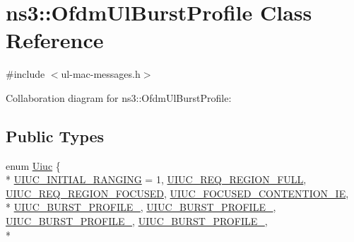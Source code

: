 \hypertarget{classns3_1_1OfdmUlBurstProfile}{}\section{ns3\+:\+:Ofdm\+Ul\+Burst\+Profile Class Reference}
\label{classns3_1_1OfdmUlBurstProfile}


{\ttfamily \#include $<$ul-\/mac-\/messages.\+h$>$}



Collaboration diagram for ns3\+:\+:Ofdm\+Ul\+Burst\+Profile\+:
\subsection*{Public Types}
\begin{DoxyCompactItemize}
\item 
enum \hyperlink{classns3_1_1OfdmUlBurstProfile_ae528783c4b3c6700ff49dfd7a555cb3d}{Uiuc} \{ \\*
\hyperlink{classns3_1_1OfdmUlBurstProfile_ae528783c4b3c6700ff49dfd7a555cb3daaea7b6256d4bcd0125f0248c0560c94e}{U\+I\+U\+C\+\_\+\+I\+N\+I\+T\+I\+A\+L\+\_\+\+R\+A\+N\+G\+I\+NG} = 1, 
\hyperlink{classns3_1_1OfdmUlBurstProfile_ae528783c4b3c6700ff49dfd7a555cb3daae074d10caa7fe18da973227c7f9942f}{U\+I\+U\+C\+\_\+\+R\+E\+Q\+\_\+\+R\+E\+G\+I\+O\+N\+\_\+\+F\+U\+LL}, 
\hyperlink{classns3_1_1OfdmUlBurstProfile_ae528783c4b3c6700ff49dfd7a555cb3da3d02d63517ee75fb1740c4bd13c5bcb7}{U\+I\+U\+C\+\_\+\+R\+E\+Q\+\_\+\+R\+E\+G\+I\+O\+N\+\_\+\+F\+O\+C\+U\+S\+ED}, 
\hyperlink{classns3_1_1OfdmUlBurstProfile_ae528783c4b3c6700ff49dfd7a555cb3da98297c6c3c66bd115e1b1912200b4a08}{U\+I\+U\+C\+\_\+\+F\+O\+C\+U\+S\+E\+D\+\_\+\+C\+O\+N\+T\+E\+N\+T\+I\+O\+N\+\_\+\+IE}, 
\\*
\hyperlink{classns3_1_1OfdmUlBurstProfile_ae528783c4b3c6700ff49dfd7a555cb3da079b5408a66358de8b0d4afdc880d22a}{U\+I\+U\+C\+\_\+\+B\+U\+R\+S\+T\+\_\+\+P\+R\+O\+F\+I\+L\+E\+\_}, 
\hyperlink{classns3_1_1OfdmUlBurstProfile_ae528783c4b3c6700ff49dfd7a555cb3dad83dc59c38492f96faaf788f981e8d66}{U\+I\+U\+C\+\_\+\+B\+U\+R\+S\+T\+\_\+\+P\+R\+O\+F\+I\+L\+E\+\_}, 
\hyperlink{classns3_1_1OfdmUlBurstProfile_ae528783c4b3c6700ff49dfd7a555cb3da876466c4ff2656b75374a2f3f245ac94}{U\+I\+U\+C\+\_\+\+B\+U\+R\+S\+T\+\_\+\+P\+R\+O\+F\+I\+L\+E\+\_}, 
\hyperlink{classns3_1_1OfdmUlBurstProfile_ae528783c4b3c6700ff49dfd7a555cb3da3c686ed9ad556420c8438af9bc26e13e}{U\+I\+U\+C\+\_\+\+B\+U\+R\+S\+T\+\_\+\+P\+R\+O\+F\+I\+L\+E\+\_}, 
\\*

\end{DoxyCompactItemize}
